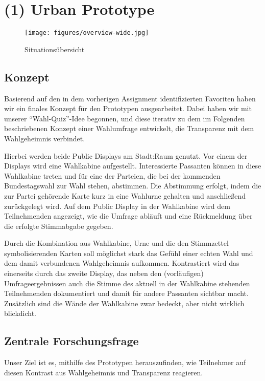 \section{(1) Urban Prototype}\label{urban-prototype}

\begin{figure}[ht]
    \centering
    \texttt{[image: figures/overview-wide.jpg]}
    \caption{Situationsübersicht }
    \label{fig:urban-prototype}
\end{figure}

\subsection{Konzept}\label{konzept}

Basierend auf den in dem vorherigen Assignment identifizierten Favoriten haben wir ein finales Konzept für den Prototypen ausgearbeitet.
Dabei haben wir mit unserer ``Wahl-Quiz''-Idee begonnen, und diese iterativ zu dem im Folgenden beschriebenen Konzept einer Wahlumfrage entwickelt, die Transparenz mit dem Wahlgeheimnis verbindet.

Hierbei werden beide Public Displays am Stadt:Raum genutzt.
Vor einem der Displays wird eine Wahlkabine aufgestellt.
Interessierte Passanten können in diese Wahlkabine treten und für eine der Parteien, die bei der kommenden Bundestagswahl zur Wahl stehen, abstimmen.
Die Abstimmung erfolgt, indem die zur Partei gehörende Karte kurz in eine Wahlurne gehalten und anschließend zurückgelegt wird.
Auf dem Public Display in der Wahlkabine wird dem Teilnehmenden angezeigt, wie die Umfrage abläuft und eine Rückmeldung über die erfolgte Stimmabgabe gegeben.

Durch die Kombination aus Wahlkabine, Urne und die den Stimmzettel symbolisierenden Karten soll möglichst stark das Gefühl einer echten Wahl und dem damit verbundenen Wahlgeheimnis aufkommen.
Kontrastiert wird das einerseits durch das zweite Display, das neben den (vorläufigen) Umfrageergebnissen auch die Stimme des aktuell in der Wahlkabine stehenden Teilnehmenden dokumentiert und damit für andere Passanten sichtbar macht.
Zusätzlich sind die Wände der Wahlkabine zwar bedeckt, aber nicht wirklich blickdicht.

\subsection{Zentrale Forschungsfrage}\label{zentrale-forschungsfrage}

Unser Ziel ist es, mithilfe des Prototypen herauszufinden, wie Teilnehmer auf diesen Kontrast aus Wahlgeheimnis und Transparenz reagieren.

